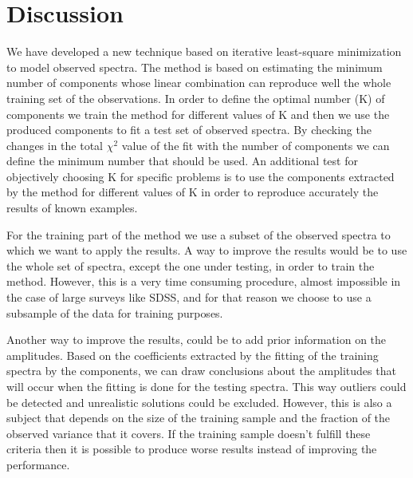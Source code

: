 \documentclass[12pt,preprint]{aastex}
\begin{document}
\section{Discussion}\label{discussion}
We have developed a new technique based on iterative least-square minimization to model observed spectra. The method is based on estimating the minimum number of components whose linear combination can reproduce well the whole training set of the observations. In order to define the optimal number (K) of components we train the method for different values of K and then we use the produced components to fit a test set of observed spectra. By checking the changes in the total $\chi^2$ value of the fit with the number of components we can define the minimum number that should be used. An additional test for objectively choosing K for specific problems is to use the components extracted by the method for different values of K in order to reproduce accurately the results of known examples.

For the training part of the method we use a subset of the observed spectra to which we want to apply the results. A way to improve the results would be to use the whole set of spectra, except the one under testing, in order to train the method. However, this is a very time consuming procedure, almost impossible in the case of large surveys like SDSS, and for that reason we choose to use a subsample of the data for training purposes.

Another way to improve the results, could be to add prior information on the amplitudes. Based on the coefficients extracted by the fitting of the training spectra by the components, we can draw conclusions about the amplitudes that will occur when the fitting is done for the testing spectra. This way outliers could be detected and unrealistic solutions could be excluded. However, this is also a subject that depends on the size of the training sample and the fraction of the observed variance that it covers. If the training sample doesn't fulfill these criteria then it is possible to produce worse results instead of improving the performance.
\end{document}
